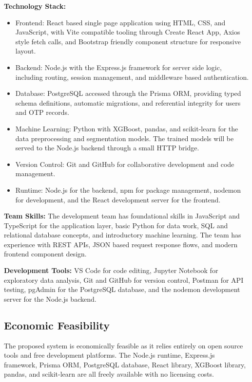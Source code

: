 \documentclass[12pt, a4paper]{report}
\numberwithin{equation}{chapter}
\begin{document}
\textbf{Technology Stack:}
\begin{itemize}
\item Frontend: React based single page application using HTML, CSS, and JavaScript, with Vite compatible tooling through Create React App, Axios style fetch calls, and Bootstrap friendly component structure for responsive layout.
\item Backend: Node.js with the Express.js framework for server side logic, including routing, session management, and middleware based authentication.
\item Database: PostgreSQL accessed through the Prisma ORM, providing typed schema definitions, automatic migrations, and referential integrity for users and OTP records.
\item Machine Learning: Python with XGBoost, pandas, and scikit-learn for the data preprocessing and segmentation models. The trained models will be served to the Node.js backend through a small HTTP bridge.
\item Version Control: Git and GitHub for collaborative development and code management.
\item Runtime: Node.js for the backend, npm for package management, nodemon for development, and the React development server for the frontend.
\end{itemize}

\textbf{Team Skills:} The development team has foundational skills in JavaScript and TypeScript for the application layer, basic Python for data work, SQL and relational database concepts, and introductory machine learning. The team has experience with REST APIs, JSON based request response flows, and modern frontend component design.

\textbf{Development Tools:} VS Code for code editing, Jupyter Notebook for exploratory data analysis, Git and GitHub for version control, Postman for API testing, pgAdmin for the PostgreSQL database, and the nodemon development server for the Node.js backend.

\subsection{Economic Feasibility}

The proposed system is economically feasible as it relies entirely on open source tools and free development platforms. The Node.js runtime, Express.js framework, Prisma ORM, PostgreSQL database, React library, XGBoost library, pandas, and scikit-learn are all freely available with no licensing costs.
\end{document}

